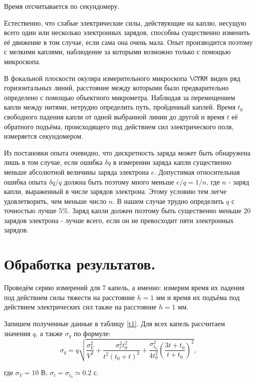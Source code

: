 \documentclass[a4paper, 12pt, twoside]{article}
\begin{document}
Время отсчитывается по секундомеру.

Естественно, что слабые электрические силы, действующие на каплю, несущую всего один или несколько электронных зарядов, способны существенно изменить её движение в том случае, если сама она очень мала. Опыт производится поэтому с мелкими каплями, наблюдение за которыми возможно только с помощью микроскопа.

В фокальной плоскости окуляра измерительного микроскопа $\CYRM$ виден ряд горизонтальных линий, расстояние между которыми было предварительно определено с помощью объектного микрометра. Наблюдая за перемещением капли между нитями, нетрудно определить путь, пройденный каплей. Время $t_0$ свободного падения капли от одной выбранной линии до другой и время $t$ её обратного подъёма, происходящего под действием сил электрического поля, измеряется секундомером.

Из постановки опыта очевидно, что дискретность заряда может быть обнаружена лишь в том случае, если ошибка $\delta q$ в измерении заряда капли существенно меньше абсолютной величины заряда электрона $e$. Допустимая относительная ошибка опыта $\delta q/q$ должна быть поэтому много меньше $e/q = 1/n$, где $n$ - заряд капли, выраженный в числе зарядов электрона. Этому условию тем легче удовлетворить, чем меньше число $n$. В нашем случае трудно определить $q$ с точностью лучше $5\%$. Заряд капли должен поэтому быть существенно меньше 20 зарядов электрона - лучше всего, если он не превосходит пяти электронных зарядов.
\newpage
\section{Обработка результатов.}

Проведём серию измерений для 7 капель, а именно: измерим время их падения под действием силы тяжести на расстояние $h = 1$ мм и время их подъёма под действием электрических сил также на расстояние $h = 1$ мм.

Запишем полученные данные в таблицу \ref{t1}. Для всех капель рассчитаем значения $q$, а также $\sigma_q$ по формуле:
$$\sigma_q = q\sqrt{\dfrac{\sigma_V^2}{V^2} + \dfrac{\sigma_t^2 t_0^2}{t^2(t_0+t)^2} + \dfrac{\sigma_{t_0}^2}{4t_0^2} \left(\dfrac{3t+t_0}{t+t_0}\right)^2},$$

где $\sigma_V = 10$ В, $\sigma_t=\sigma_{t_0}\simeq 0.2$ с.
\end{document}
